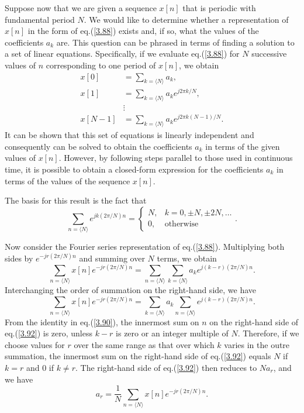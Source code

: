 \documentclass[a4paper,10pt,twoside]{book}
\begin{document}
Suppose now that we are given a sequence $x[n]$ that is periodic with fundamental period $N$. We would like to determine whether a representation of $x[n]$ in the form of eq.\;(\ref{3.88}) exists and, if so, what the values of the coefficients $a_k$ are. This question can be phrased in terms of finding a solution to a set of linear equations. Specifically, if we evaluate eq.\;(\ref{3.88}) for $N$ successive values of $n$ corresponding to one period of $x[n]$, we obtain
\begin{equation}
    \begin{aligned}x[0]& =\sum_{k=\langle N\rangle}a_{k},\\x[1]& =\sum_{k=\langle N\rangle}a_{k}e^{j2\pi k/N},\\&\vdots\\x[N-1]& =\sum_{k=\langle N\rangle}a_{k}e^{j2\pi k(N-1)/N}.\end{aligned}
    \label{3.89}
\end{equation}
It can be shown that this set of equations is linearly independent and consequently can be solved to obtain the coefficients $a_k$ in terms of the given values of $x[n]$. However, by following steps parallel to those used in continuous time, it is possible to obtain a closed-form expression for the coefficients $a_k$ in terms of the values of the sequence $x[n]$.

The basis for this result is the fact that
\begin{equation}
    \left.\sum_{n=\langle N\rangle}e^{jk(2\pi/N)n}=\left\{\begin{array}{ll}N,&k=0,\pm N,\pm2N,\ldots\\0,&\text{otherwise}\end{array}\right.\right..
    \label{3.90}
\end{equation}

Now consider the Fourier series representation of eq.\;(\ref{3.88}). Multiplying both sides by $e^{-jr(2\pi/N)n}$ and summing over $N$ terms, we obtain
\begin{equation}
    \sum_{n=\langle N\rangle}x[n]e^{-jr(2\pi/N)n}=\sum_{n=\langle N\rangle}\sum_{k=\langle N\rangle}a_ke^{j(k-r)(2\pi/N)n}.
    \label{3.91}
\end{equation}
Interchanging the order of summation on the right-hand side, we have
\begin{equation}
    \sum_{n=\langle N\rangle}x[n]e^{-jr(2\pi/N)n}=\sum_{k=\langle N\rangle}a_k\sum_{n=\langle N\rangle}e^{j(k-r)(2\pi/N)n}.
    \label{3.92}
\end{equation}
From the identity in eq.\;(\ref{3.90}), the innermost sum on $n$ on the right-hand side of eq.\;(\ref{3.92}) is zero, unless $k-r$ is zero or an integer multiple of $N$. Therefore, if we choose values for $r$ over the same range as that over which $k$ varies in the outre summation, the innermost sum on the right-hand side of eq.\;(\ref{3.92}) equals $N$ if $k=r$ and 0 if $k\ne r$. The right-hand side of eq.\;(\ref{3.92}) then reduces to $Na_r$, and we have
\begin{equation}
    a_r = \frac{1}{N}\sum_{n=\langle N\rangle}x[n]e^{-jr(2\pi/N)n}.
    \label{3.93}
\end{equation}
\end{document}
